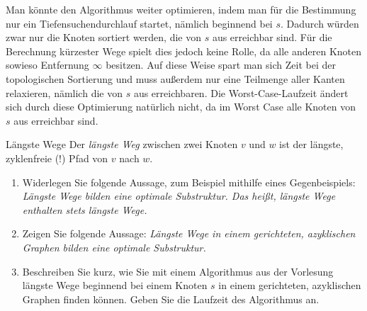 \documentclass[11pt,a4paper]{article}
\begin{document}
\begin{loesung}
\begin{enumerate}
        Man könnte den Algorithmus weiter optimieren, indem man für die Bestimmung nur ein Tiefensuchendurchlauf startet, nämlich beginnend bei $s$.
        Dadurch würden zwar nur die Knoten sortiert werden, die von $s$ aus erreichbar sind.
        Für die Berechnung kürzester Wege spielt dies jedoch keine Rolle, da alle anderen Knoten sowieso Entfernung $\infty$ besitzen.
        Auf diese Weise spart man sich Zeit bei der topologischen Sortierung und muss außerdem nur eine Teilmenge aller Kanten relaxieren, nämlich die von $s$ aus erreichbaren.
        Die Worst-Case-Laufzeit ändert sich durch diese Optimierung natürlich nicht, da im Worst Case alle Knoten von $s$ aus erreichbar sind.
    \end{enumerate}
\end{loesung}
\begin{aufgabe}{4}{Längste Wege}
    Der \emph{längste Weg} zwischen zwei Knoten $v$ und $w$ ist der längste, zyklenfreie (!) Pfad von $v$ nach $w$.
    \begin{enumerate}[label=\alph*)]
        \item Widerlegen Sie folgende Aussage, zum Beispiel mithilfe eines Gegenbeispiels:
        \emph{Längste Wege bilden eine optimale Substruktur. Das heißt, längste Wege enthalten stets längste Wege.}
        \item\label{longest_path_dag}Zeigen Sie folgende Aussage:
        \emph{Längste Wege in einem gerichteten, azyklischen Graphen bilden eine optimale Substruktur.}
        \item Beschreiben Sie kurz, wie Sie mit einem Algorithmus aus der Vorlesung längste Wege beginnend bei einem Knoten $s$ in einem gerichteten, azyklischen Graphen finden können.
        Geben Sie die Laufzeit des Algorithmus an.
    \end{enumerate}
\end{aufgabe}
\end{document}
